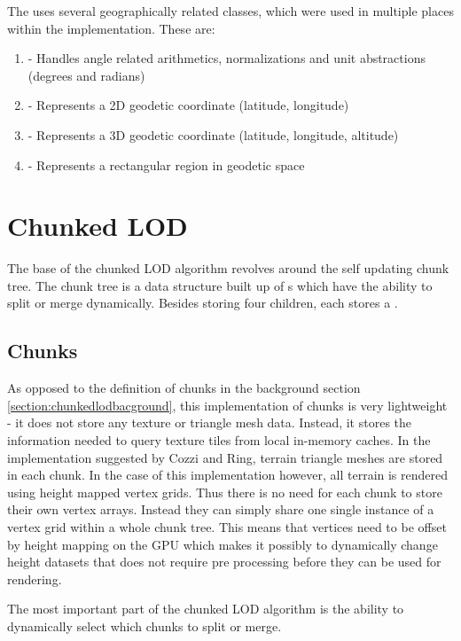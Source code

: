 The  uses several geographically related classes, which were used in multiple places within the implementation. These are:
\begin{enumerate}
	\item {} - Handles angle related arithmetics, normalizations and unit abstractions (degrees and radians)
	\item {} - Represents a 2D geodetic coordinate (latitude, longitude)
	\item {} - Represents a 3D geodetic coordinate (latitude, longitude, altitude)
	\item {} - Represents a rectangular region in geodetic space
\end{enumerate}

\section{Chunked LOD}
The base of the chunked LOD algorithm revolves around the self updating chunk tree. The chunk tree is a data structure built up of s which have the ability to split or merge dynamically. Besides storing four  children, each  stores a .

\subsection{Chunks}
As opposed to the definition of chunks in the background section \ref{section:chunkedlodbacground}, this implementation of chunks is very lightweight - it does not store any texture or triangle mesh data. Instead, it stores the information needed to query texture tiles from local in-memory caches. In the implementation suggested by Cozzi and Ring, terrain triangle meshes are stored in each chunk. In the case of this implementation however, all terrain is rendered using height mapped vertex grids. Thus there is no need for each chunk to store their own vertex arrays. Instead they can simply share one single instance of a vertex grid within a whole chunk tree. This means that vertices need to be offset by height mapping on the GPU which makes it possibly to dynamically change height datasets that does not require pre processing before they can be used for rendering.

The most important part of the chunked LOD algorithm is the ability to dynamically select which chunks to split or merge. 

